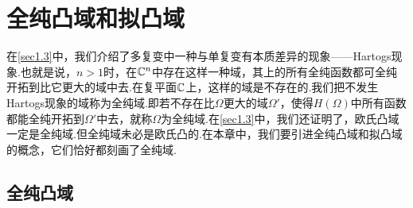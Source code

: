 \chapter{全纯凸域和拟凸域\label{chap5}}
在\ref{sec1.3}中，我们介绍了多复变中一种与单复变有本质差异的现象——Hartogs现象.也就是说，$n>1$时，在$\mathbb C^n$中存在这样一种域，其上的所有全纯函数都可全纯开拓到比它更大的域中去.在复平面$\mathbb C$上，这样的域是不存在的.我们把不发生Hartogs现象的域称为全纯域.即若不存在比$\Omega$更大的域$\Omega'$，使得$H(\Omega)$中所有函数都能全纯开拓到$\Omega'$中去，就称$\Omega$为全纯域.在\ref{sec1.3}中，我们还证明了，欧氏凸域一定是全纯域.但全纯域未必是欧氏凸的.在本章中，我们要引进全纯凸域和拟凸域的概念，它们恰好都刻画了全纯域.
\section{全纯凸域\label{sec5.1}}
